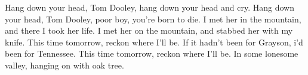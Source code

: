 \beginchorus
Hang down your head, Tom Dooley,
hang down your head and cry.
Hang down your head, Tom Dooley,
poor boy, you’re born to die.
\endchorus
\beginverse*
I met her in the mountain,
and there I took her life.
I met her on the mountain,
and stabbed her with my knife.
\endverse
\beginverse*
This time tomorrow,
reckon where I’ll be.
If it hadn’t been for Grayson,
i’d been for Tennessee.
\endverse
\beginverse*
This time tomorrow,
reckon where I’ll be.
In some lonesome valley,
hanging on with oak tree.
\endverse
\endsong 